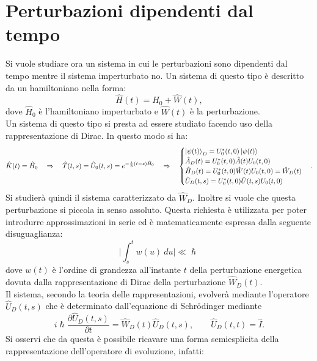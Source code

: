 \section{Perturbazioni dipendenti dal tempo}
Si vuole studiare ora un sistema in cui le perturbazioni sono dipendenti dal tempo mentre il sistema imperturbato no. Un sistema di questo tipo è descritto da un hamiltoniano nella forma:
\begin{equation*}
    \hat H(t)=\hat H_0+\hat W(t),
\end{equation*}
dove $\hat H_0$ è l'hamiltoniano imperturbato e $\hat W(t)$ è la perturbazione.\\
Un sistema di questo tipo si presta ad essere studiato facendo uso della rappresentazione di Dirac. In questo modo si ha:
\begin{equation*}
    \hat K(t)=\hat H_0\quad\Rightarrow\quad\hat T(t,s) =\hat U_0(t,s)= e^{-\frac{i}{\hslash}(t-s)\hat H_0}\quad\Rightarrow\quad
    \begin{cases}
        \ket{\psi(t)}_D=U_0^*(t,0)\ket{\psi(t)}\\
        \hat A_D(t)=U_0^*(t,0)\hat A(t)U_0(t,0)\\
        \hat H_D(t)=U_0^*(t,0)\hat W(t)U_0(t,0)=\hat W_D(t)\\
        \hat U_D(t,s)=U_0^*(t,0)\hat U(t,s)U_0(t,0)
    \end{cases}.
\end{equation*}
Si studierà quindi il sistema caratterizzato da $\hat W_D$.
Inoltre si vuole che questa perturbazione si piccola in senso assoluto. Questa richiesta è utilizzata per poter introdurre approssimazioni in serie ed è matematicamente espressa dalla seguente disuguaglianza:
\begin{equation}
    \bigg|\int_s^tw(u)\ du\bigg|\ll\hslash \,\label{condPertTempo}
\end{equation}
dove $w(t)$ è l'ordine di grandezza all'instante $t$ della perturbazione energetica dovuta dalla rappresentazione di Dirac della perturbazione $\hat W_D(t)$.\\
Il sistema, secondo la teoria delle rappresentazioni, evolverà mediante l'operatore $\hat U_D(t,s)$ che è determinato dall'equazione di Schrödinger mediante
\begin{equation*}
    i\hslash\frac{\partial \hat U_D(t,s)}{\partial t}=\hat W_D(t)\hat U_D(t,s),\qquad \hat U_D(t,t)=\hat I.
\end{equation*}
Si osservi che da questa è possibile ricavare una forma semiesplicita della rappresentazione dell'operatore di evoluzione, infatti:
